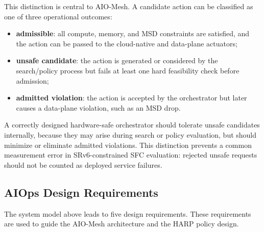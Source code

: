 \documentclass[final,5p]{elsarticle}
\begin{document}
This distinction is central to AIO-Mesh. A candidate action can be classified as one of three operational outcomes:
\begin{itemize}
    \item \textbf{admissible}: all compute, memory, and MSD constraints are satisfied, and the action can be passed to the cloud-native and data-plane actuators;
    \item \textbf{unsafe candidate}: the action is generated or considered by the search/policy process but fails at least one hard feasibility check before admission;
    \item \textbf{admitted violation}: the action is accepted by the orchestrator but later causes a data-plane violation, such as an MSD drop.
\end{itemize}
A correctly designed hardware-safe orchestrator should tolerate unsafe candidates internally, because they may arise during search or policy evaluation, but should minimize or eliminate admitted violations. This distinction prevents a common measurement error in SRv6-constrained SFC evaluation: rejected unsafe requests should not be counted as deployed service failures.

\subsection{AIOps Design Requirements}
\label{subsec:design_requirements}

The system model above leads to five design requirements. These requirements are used to guide the AIO-Mesh architecture and the HARP policy design.
\end{document}
